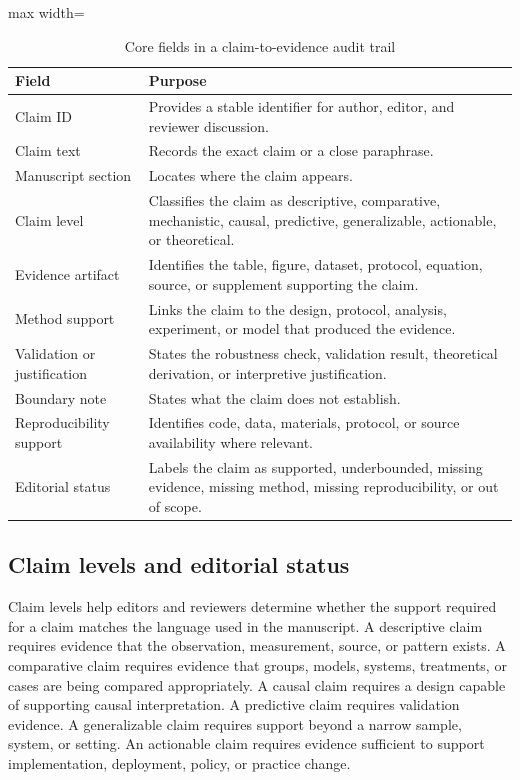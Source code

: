 \documentclass[12pt]{article}
\begin{document}
\begin{table}[htbp]
\centering
\caption{Core fields in a claim-to-evidence audit trail}
\begin{adjustbox}{max width=\textwidth}
\begin{tabularx}{\textwidth}{p{}X}
\toprule
\textbf{Field} & \textbf{Purpose} \\
\midrule
Claim ID & Provides a stable identifier for author, editor, and reviewer discussion. \\
Claim text & Records the exact claim or a close paraphrase. \\
Manuscript section & Locates where the claim appears. \\
Claim level & Classifies the claim as descriptive, comparative, mechanistic, causal, predictive, generalizable, actionable, or theoretical. \\
Evidence artifact & Identifies the table, figure, dataset, protocol, equation, source, or supplement supporting the claim. \\
Method support & Links the claim to the design, protocol, analysis, experiment, or model that produced the evidence. \\
Validation or justification & States the robustness check, validation result, theoretical derivation, or interpretive justification. \\
Boundary note & States what the claim does not establish. \\
Reproducibility support & Identifies code, data, materials, protocol, or source availability where relevant. \\
Editorial status & Labels the claim as supported, underbounded, missing evidence, missing method, missing reproducibility, or out of scope. \\
\bottomrule
\end{tabularx}
\end{adjustbox}
\end{table}

\subsection{Claim levels and editorial status}

Claim levels help editors and reviewers determine whether the support required for a claim matches the language used in the manuscript. A descriptive claim requires evidence that the observation, measurement, source, or pattern exists. A comparative claim requires evidence that groups, models, systems, treatments, or cases are being compared appropriately. A causal claim requires a design capable of supporting causal interpretation. A predictive claim requires validation evidence. A generalizable claim requires support beyond a narrow sample, system, or setting. An actionable claim requires evidence sufficient to support implementation, deployment, policy, or practice change.
\end{document}
